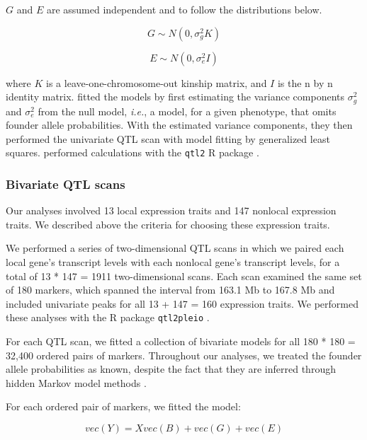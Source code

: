 \documentclass{article}
\begin{document}
$G$ and $E$ are assumed independent and to follow the distributions below.

\begin{equation}
    G \sim N(0, \sigma^2_gK)
\end{equation}

\begin{equation}
    E \sim N(0, \sigma^2_eI)
\end{equation}

where $K$ is a leave-one-chromosome-out kinship matrix, and $I$ is the n by n identity matrix. \citet{keller2018genetic} fitted the models by first estimating the variance components $\sigma^2_g$ and $\sigma^2_e$ from the null model, \emph{i.e.}, a model, for a given phenotype, that omits founder allele probabilities. With the estimated variance components, they then performed the univariate QTL scan with model fitting by generalized least squares. \citet{keller2018genetic} performed calculations with the \texttt{qtl2} R package \citep{Broman2018}.



\subsubsection{Bivariate QTL scans}

Our analyses involved 13 local expression traits and 147 nonlocal expression traits. We described above the criteria for choosing these expression traits.

We performed a series of two-dimensional QTL scans in which we paired each local gene's transcript levels with each nonlocal gene's transcript levels, for a total of 13 * 147 = 1911 two-dimensional scans. Each scan examined the same set of 180 markers, which spanned the interval from 163.1 Mb to 167.8 Mb and included univariate peaks for all 13 + 147 = 160 expression traits. We performed these analyses with the R package \texttt{qtl2pleio} \citep{qtl2pleio}.

For each QTL scan, we fitted a collection of bivariate models for all 180 * 180 = 32,400 ordered pairs of markers. Throughout our analyses, we treated the founder allele probabilities as known, despite the fact that they are inferred through hidden Markov model methods \citep{broman2012genotype, broman2012haplotype, Broman2018}. 

For each ordered pair of markers, we fitted the model:

\begin{equation}
    vec(Y) = Xvec(B) + vec(G) + vec(E)
    \label{eqn:bivariate-model}
\end{equation}
\end{document}
